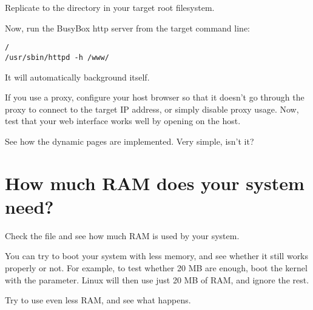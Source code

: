 Replicate  to the  directory in your target root filesystem.

Now, run the BusyBox http server from the target command line:

\begin{verbatim}/
/usr/sbin/httpd -h /www/
\end{verbatim}

It will automatically background itself.

If you use a proxy, configure your host browser so that it doesn't go
through the proxy to connect to the target IP address, or simply
disable proxy usage.  Now, test that your web interface works well by
opening  on the host.

See how the dynamic pages are implemented. Very simple, isn't it?

\section{How much RAM does your system need?}

Check the  file and see how much RAM is used by your
system.

You can try to boot your system with less memory, and see whether it
still works properly or not. For example, to test whether 20 MB are
enough, boot the kernel with the  parameter. Linux will then
use just 20 MB of RAM, and ignore the rest.

Try to use even less RAM, and see what happens.
